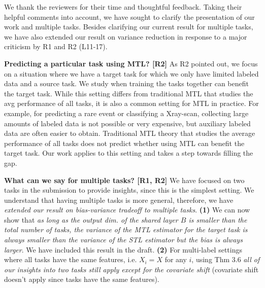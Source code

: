 \documentclass{article}
\begin{document}
We thank the reviewers for their time and thoughtful feedback.
Taking their helpful comments into account, we have sought to clarify the presentation of our work and  multiple tasks. %
Besides clarifying our current result for multiple tasks, we have also extended our result on variance reduction in response to a major criticism by R1 and R2 (L11-17).


\vspace{-0.02in}
\textbf{Predicting a particular task using MTL? [R2]}
As R2 pointed out, we focus on a situation where we have a target task for which we only have limited labeled data and a source task.
We study when training the tasks together can benefit the target task.
While this setting differs from traditional MTL that studies the avg performance of all tasks, it is also a common setting for MTL in practice.
For example, for predicting a rare event or classifying a Xray-scan, collecting large amounts of labeled data is not possible or very expensive, but auxiliary labeled data are often easier to obtain.
Traditional MTL theory that studies the average performance of all tasks does not predict whether using MTL can benefit the target task.
Our work applies to this setting and takes a step towards filling the gap.


\vspace{-0.025in}
\textbf{What can we say for multiple tasks? [R1, R2]}
We have focused on two tasks in the submission to provide insights, since this is the simplest setting.
We understand that having multiple tasks is more general, therefore, we have \textit{extended our result on bias-variance tradeoff to multiple tasks}.
\textbf{(1)} We can now show that \textit{as long as the output dim. of the shared layer $B$ is smaller than the total number of tasks, the variance of the MTL estimator for the target task is always smaller than the variance of the STL estimator but the bias is always larger}.
We have included this result in the draft.
\textbf{(2)} For multi-label settings where all tasks have the same features, i.e. $X_i = X$ for any $i$, using Thm 3.6 \textit{all of our insights into two tasks still apply except for the covariate shift} (covariate shift doesn't apply since tasks have the same features).
\end{document}
